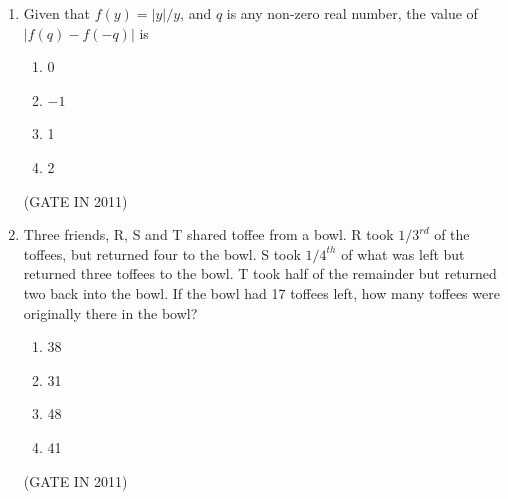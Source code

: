 \documentclass[journal]{IEEEtran}
\begin{document}
\begin{enumerate}
\item Given that $f(y)=|y| / y$, and $q$ is any non-zero real number, the value of $|f(q)-f(-q)|$ is

\begin{multicols}{4}
\begin{enumerate}
\item 0
\item $-1$
\item 1
\item 2
\end{enumerate}
\end{multicols} \hfill(GATE IN 2011)

\item Three friends, R, S and T shared toffee from a bowl. R took $1/3^{rd}$ of the toffees, but returned four to the bowl. S took $1/4^{th}$ of what was left but returned three toffees to the bowl. T took half of the remainder but returned two back into the bowl. If the bowl had 17 toffees left, how many toffees were originally there in the bowl?

\begin{multicols}{4}
\begin{enumerate}
\item 38
\item 31
\item 48
\item 41
\end{enumerate}
\end{multicols} 
\hfill(GATE IN 2011)
\end{enumerate}
\end{document}
